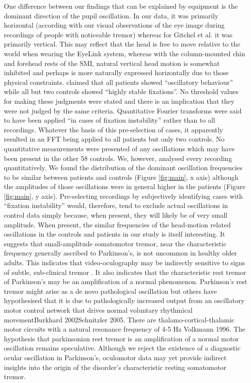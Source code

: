 \documentclass[jou,a4paper]{apa6}
\begin{document}
One difference between our findings that can be explained by equipment is the dominant direction of the pupil oscillation. In our data, it was primarily horizontal (according with our visual observations of the eye image during recordings of people with noticeable tremor) whereas for Gitchel et al. it was primarily vertical. This may reflect that the head is free to move relative to the world when wearing the EyeLink system, whereas with the column-mounted chin and forehead rests of the SMI, natural vertical head motion is somewhat inhibited and perhaps is more naturally expressed horizontally due to those physical constraints.
\citet{Gitchel2012Pervasive-ocula} claimed that all patients showed ``oscillatory behaviour'' while all but two controls showed ``highly stable fixations''. No threshold values for making these judgments were stated and there is an implication that they were not judged by the same criteria. Quantitative Fourier transforms were said to have been applied ``in cases of fixation instability'' rather than to all recordings. Whatever the basis of this pre-selection of cases, it apparently resulted in an FFT being applied to all patients but only two controls. No quantitative measurements were presented of any oscillations which may have been present in the other 58 controls. We, however, analysed every recording quantitatively. We found the distribution of the dominant oscillation frequencies to be similar between patients and controls (Figure \ref{fig:main}, x axis) although the amplitudes of those oscillations were in general higher in the patients (Figure \ref{fig:main}, y axis). Pre-selecting recordings by subjectively identifying cases with ``fixation instability'' would, therefore, tend to exclude actual oscillations in control data simply because, when present, they will likely be of very small amplitude.
When present, the similar frequencies of the head-motion related oscillations in the controls and patients in our study is itself interesting. It suggests that small-amplitude somatomotor tremor, near the characteristic frequency generally ascribed to Parkinson's, is not uncommon in healthy older adults. This indicates that video-oculography may be indirectly sensitive to signs of subtle, sub-clinical tremor \citep{MacAskill2013Ocular-Tremor-i}. It also indicates that the characteristic rest tremor of Parkinson's may be an amplification of a normal phenomenon. Parkinson's rest tremor might arise as a de novo pathological oscillation \citep{McAuley2000Physiological-a} but others have hypothesised that it is due to pathologically increased output from an oscillatory motor control network that drives normal voluntary rhythmical movement{Burkhard 2002}{Schnitzler 2005}. There are thalamo-cortical-thalamic motor circuits with a natural resonance frequency of 4-5 Hz {Volkmann 1996}. The hypothesis that parkinsonian rest tremor is an amplification of a normal motor oscillation remains speculative. Although we reject the existence of a diagnostic ocular oscillation in Parkinson's, oculomotor data may yet provide indirect insights into the origin of the disorder's characteristic resting somatomotor tremor.
\end{document}
